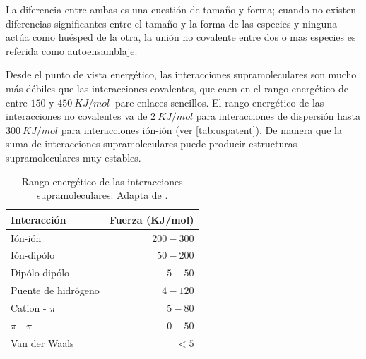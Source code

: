 La diferencia entre ambas es una cuestión de tamaño y forma; cuando no existen diferencias significantes entre el tamaño y la forma de las especies y ninguna actúa como huésped de la otra, la unión no covalente entre dos o mas especies es referida como autoensamblaje.

Desde el punto de vista energético, las interacciones supramoleculares son mucho más débiles que las interacciones covalentes, que caen en el rango energético de entre $150$ y $450~KJ/mol ~$ pare enlaces sencillos. 
El rango energético de las interacciones no covalentes va de $2~KJ/mol$ para interacciones de dispersión hasta $300~KJ/mol$ para interacciones ión-ión (ver \autoref{tab:uspatent}). De manera que la suma de interacciones supramoleculares puede producir estructuras supramoleculares muy estables.

\begin{table}
\caption[Interacciones supramoleculares] {Rango energético de las interacciones supramoleculares. Adapta de \cite{IMP:Patente}.}
\centering
\begin{tabulary}{1.1\textwidth}{L |R}
    Interacción & Fuerza (KJ/mol) \\
    \toprule
    Ión-ión & $200-300$ \\
    Ión-dipólo & $50-200$ \\
    Dipólo-dipólo & $5-50$  \\
    Puente de hidrógeno & $4-120$ \\
    Cation - $\pi$ & $5-80$ \\
    $\pi$ - $\pi$ & $0-50$ \\
    Van der Waals & $<5$ \\
    \midrule
    \bottomrule
\end{tabulary}
\label{tab:uspatent}
\end{table}



